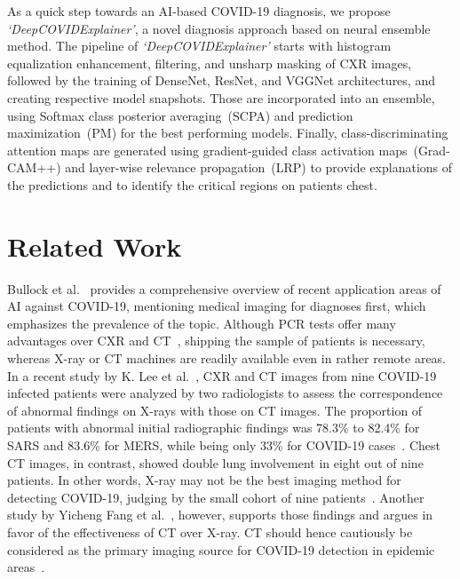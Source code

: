 \documentclass[conference]{IEEEtran}
\begin{document}
As a quick step towards an AI-based COVID-19 diagnosis, we propose \emph{`DeepCOVIDExplainer'}, a novel diagnosis approach based on neural ensemble method. The pipeline of \emph{`DeepCOVIDExplainer'} starts with histogram equalization enhancement, filtering, and unsharp masking of CXR images, followed by the training of DenseNet, ResNet, and VGGNet architectures, and creating respective model snapshots. Those are incorporated into an ensemble, using Softmax class posterior averaging~(SCPA) and prediction maximization~(PM) for the best performing models. 
Finally, class-discriminating attention maps are generated using gradient-guided class activation maps~(Grad-CAM++) and layer-wise relevance propagation~(LRP) to provide explanations of the predictions and to identify the critical regions on patients chest. 

\section{Related Work}
\label{sec:rw}
Bullock et al.~\cite{bullock2020mapping} provides a comprehensive overview of recent application areas of AI against COVID-19, mentioning medical imaging for diagnoses first, which emphasizes the prevalence of the topic. Although PCR tests offer many advantages over CXR and CT~\cite{COVID3}, shipping the sample of patients is necessary, whereas X-ray or CT machines are readily available even in rather remote areas. In a recent study by K. Lee et al.~\cite{COVID1}, CXR and CT images from nine COVID-19 infected patients were analyzed by two radiologists to assess the correspondence of abnormal findings on X-rays with those on CT images. The proportion of patients with abnormal initial radiographic findings was 78.3\% to 82.4\% for SARS and 83.6\% for MERS, while being only 33\% for COVID-19 cases~\cite{COVID1}. 
Chest CT images, in contrast, showed double lung involvement in eight out of nine patients. In other words, X-ray may not be the best imaging method for detecting COVID-19, judging by the small cohort of nine patients~\cite{COVID1}. Another study by Yicheng Fang et al.~\cite{COVID2}, however, supports those findings and argues in favor of the effectiveness of CT over X-ray. CT should hence cautiously be considered as the primary imaging source for COVID-19 detection in epidemic areas~\cite{COVID3}. %
\end{document}
